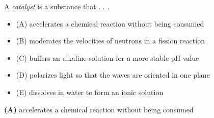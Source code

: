 

A {\it catalyst} is a substance that . . .

\begin{itemize}
\item{(A)} accelerates a chemical reaction without being consumed
\vskip 5pt 
\item{(B)} moderates the velocities of neutrons in a fission reaction
\vskip 5pt 
\item{(C)} buffers an alkaline solution for a more stable pH value
\vskip 5pt 
\item{(D)} polarizes light so that the waves are oriented in one plane
\vskip 5pt 
\item{(E)} dissolves in water to form an ionic solution
\end{itemize}







{\bf (A)} accelerates a chemical reaction without being consumed
 










